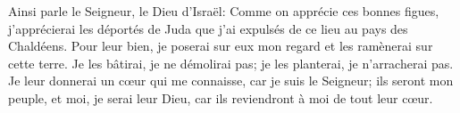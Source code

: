 Ainsi parle le Seigneur, le Dieu d’Israël:
	Comme on apprécie ces bonnes figues, j’apprécierai les déportés de Juda
		que j’ai expulsés de ce lieu au pays des Chaldéens.
Pour leur bien, je poserai sur eux mon regard et les ramènerai sur cette terre.
Je les bâtirai, je ne démolirai pas;
	je les planterai, je n’arracherai pas.
Je leur donnerai un cœur qui me connaisse, car je suis le Seigneur;
	ils seront mon peuple, et moi, je serai leur Dieu,
	car ils reviendront à moi de tout leur cœur.
